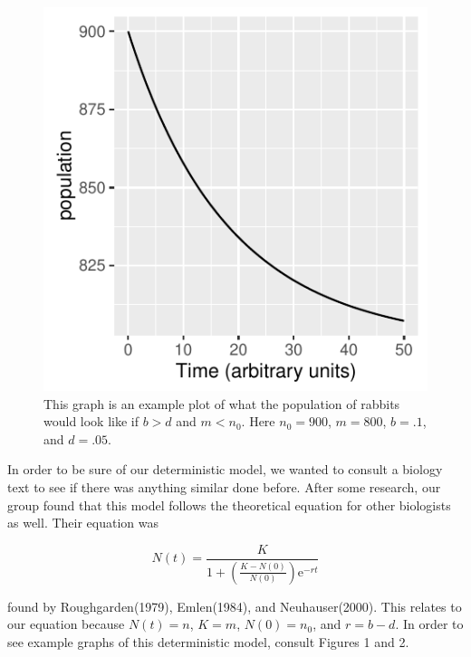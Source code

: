\documentclass[titlepage]{article}\usepackage[]{graphicx}\usepackage[]{color}
\makeatletter
\def\maxwidth{ %
  \ifdim\Gin@nat@width>\linewidth
    \linewidth
  \else
    \Gin@nat@width
  \fi
}
\newenvironment{knitrout}{}{} %
\makeatother
\begin{document}
\begin{figure}
\begin{knitrout}
\color{fgcolor}

{\centering \includegraphics[width=\maxwidth]{figure/unnamed-chunk-3-1} 

}



\end{knitrout}
\caption{This graph is an example plot of what the population of rabbits would look like if \(b > d\) and \(m < n_0\). Here \(n_0 = 900\), \(m = 800\), \(b = .1\), and \(d = .05\).}
\end{figure}

In order to be sure of our deterministic model, we wanted to consult a biology text to see if there was anything similar done before. After some research, our group found that this model follows the theoretical equation for other biologists as well. Their equation was 

\begin{equation}
N(t) = \frac{K}{1+(\frac{K-N(0)}{N(0)})\mathrm{e}^{-rt}}
\end{equation}

\noindent found by Roughgarden(1979), Emlen(1984), and Neuhauser(2000). This relates to our equation because \(N(t) = n\), \(K=m\), \(N(0)=n_0\), and \(r = b-d\). In order to see example graphs of this deterministic model, consult Figures 1 and 2.
\end{document}
